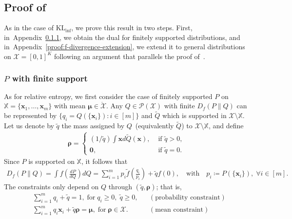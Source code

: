 \documentclass{article}
\theoremstyle{plain}
\theoremstyle{definition}
\newcommand{\lrp}[1]{\left( #1 \right)}
\newcommand{\KLinf}{\operatorname{KL_{inf}}}
\newcommand{\calP}{\mathcal P}
\newcommand{\calX}{\mathcal X}
\newcommand{\xvec}{\mathbf{x}}
\newcommand{\qtext}[1]{\quad \text{#1} \quad}
\newcommand{\Qtilde}{\widetilde{Q}}
\newcommand{\qtilde}{\widetilde{q}}
\newcommand{\boldmu}{\boldsymbol{\mu}}
\newcommand{\boldrho}{\boldsymbol{\rho}}
\newcommand{\finitesupport}{\mathbb{X}}
\newcommand{\ftilde}{\widetilde{f}}
\begin{document}
\subsection{Proof of~} 
\label{proof:f-divergence} 

As in the case of $\KLinf$, we prove this result in two steps. First, in~Appendix~\ref{proof:f-divergence-finite-support}, we obtain the dual for finitely supported distributions, and in~Appendix~\ref{proof:f-divergence-extension}, we extend it to general distributions on $\calX = [0,1]^K$ following an argument that parallels the proof of~. 

    \subsubsection{$P$ with finite support}
    \label{proof:f-divergence-finite-support} 
    As for relative entropy, we first consider the case of finitely supported $P$ on $\finitesupport = \{\xvec_1, \ldots, \xvec_m\}$ with mean $\boldmu \in \mathring{\calX}$. Any  $Q \in \calP(\calX)$ with finite $D_f(P \parallel Q)$ can be represented by $\{q_i = Q(\{\xvec_i\}): i \in [m]\}$ and $\Qtilde$ which is supported in $\calX \setminus \finitesupport$. Let us denote by $\qtilde$ the mass assigned by $Q$~(equivalently $\Qtilde$) to $\calX \setminus \finitesupport$, and define 
    \begin{align}
        \boldrho = \begin{cases}
            (1/\qtilde) \int \xvec d\Qtilde(\xvec), & \text{ if } \qtilde >0, \\
            \boldsymbol{0}, & \text{ if } \qtilde =0. 
        \end{cases}
    \end{align}
    Since $P$ is supported on $\finitesupport$, it follows that 
    \begin{align}
        D_f(P \parallel Q) = \int f \lrp{\frac{dP}{dQ}} dQ  = \sum_{i=1}^m p_i \ftilde\lrp{\frac{q_i}{p_i}} + \qtilde f(0), \qtext{with} p_i \coloneqq P(\{\xvec_i\}), \; \forall i \in [m].
    \end{align}
    The constraints only depend on $Q$ through $(\qtilde, \boldrho)$; that is, 
    \begin{align}
        &\sum_{i=1}^m q_i + \qtilde= 1, \; \text{for}\; q_i \geq 0, \; \qtilde \geq 0, && (\text{probability constraint}) \\
        &\sum_{i=1}^m q_i \xvec_i + \qtilde \boldrho = \boldmu,  \; \text{for} \; \boldrho \in \calX. && (\text{mean constraint})
    \end{align}
\end{document}
